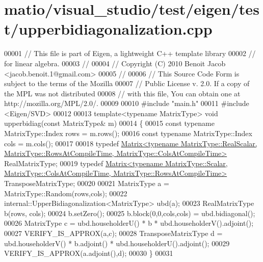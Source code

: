 \hypertarget{matio_2visual__studio_2test_2eigen_2test_2upperbidiagonalization_8cpp_source}{}\section{matio/visual\+\_\+studio/test/eigen/test/upperbidiagonalization.cpp}
\label{matio_2visual__studio_2test_2eigen_2test_2upperbidiagonalization_8cpp_source}

\begin{DoxyCode}
00001 \textcolor{comment}{// This file is part of Eigen, a lightweight C++ template library}
00002 \textcolor{comment}{// for linear algebra.}
00003 \textcolor{comment}{//}
00004 \textcolor{comment}{// Copyright (C) 2010 Benoit Jacob <jacob.benoit.1@gmail.com>}
00005 \textcolor{comment}{//}
00006 \textcolor{comment}{// This Source Code Form is subject to the terms of the Mozilla}
00007 \textcolor{comment}{// Public License v. 2.0. If a copy of the MPL was not distributed}
00008 \textcolor{comment}{// with this file, You can obtain one at http://mozilla.org/MPL/2.0/.}
00009 
00010 \textcolor{preprocessor}{#include "main.h"}
00011 \textcolor{preprocessor}{#include <Eigen/SVD>}
00012 
00013 \textcolor{keyword}{template}<\textcolor{keyword}{typename} MatrixType> \textcolor{keywordtype}{void} upperbidiag(\textcolor{keyword}{const} MatrixType& m)
00014 \{
00015   \textcolor{keyword}{const} \textcolor{keyword}{typename} MatrixType::Index rows = m.rows();
00016   \textcolor{keyword}{const} \textcolor{keyword}{typename} MatrixType::Index cols = m.cols();
00017 
00018   \textcolor{keyword}{typedef} 
      \hyperlink{group___core___module_class_eigen_1_1_matrix}{Matrix<typename MatrixType::RealScalar, MatrixType::RowsAtCompileTime,  MatrixType::ColsAtCompileTime>}
       RealMatrixType;
00019   \textcolor{keyword}{typedef} 
      \hyperlink{group___core___module_class_eigen_1_1_matrix}{Matrix<typename MatrixType::Scalar, MatrixType::ColsAtCompileTime,  MatrixType::RowsAtCompileTime>}
       TransposeMatrixType;
00020 
00021   MatrixType a = MatrixType::Random(rows,cols);
00022   internal::UpperBidiagonalization<MatrixType> ubd(a);
00023   RealMatrixType b(rows, cols);
00024   b.setZero();
00025   b.block(0,0,cols,cols) = ubd.bidiagonal();
00026   MatrixType c = ubd.householderU() * b * ubd.householderV().adjoint();
00027   VERIFY\_IS\_APPROX(a,c);
00028   TransposeMatrixType d = ubd.householderV() * b.adjoint() * ubd.householderU().adjoint();
00029   VERIFY\_IS\_APPROX(a.adjoint(),d);
00030 \}
00031 

\end{DoxyCode}
